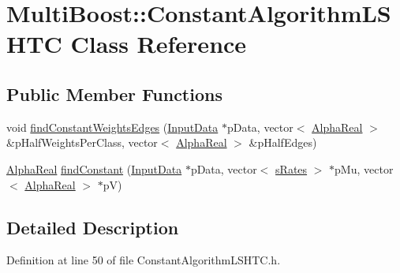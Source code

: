 \hypertarget{classMultiBoost_1_1ConstantAlgorithmLSHTC}{\section{Multi\-Boost\-:\-:Constant\-Algorithm\-L\-S\-H\-T\-C Class Reference}
\label{classMultiBoost_1_1ConstantAlgorithmLSHTC}
}
\subsection*{Public Member Functions}
\begin{DoxyCompactItemize}
\item 
void \hyperlink{classMultiBoost_1_1ConstantAlgorithmLSHTC_a9bf95b6a32ca7af3df53ab3d76f16bca}{find\-Constant\-Weights\-Edges} (\hyperlink{classMultiBoost_1_1InputData}{Input\-Data} $\ast$p\-Data, vector$<$ \hyperlink{Defaults_8h_a80184c4fd10ab70a1a17c5f97dcd1563}{Alpha\-Real} $>$ \&p\-Half\-Weights\-Per\-Class, vector$<$ \hyperlink{Defaults_8h_a80184c4fd10ab70a1a17c5f97dcd1563}{Alpha\-Real} $>$ \&p\-Half\-Edges)
\item 
\hyperlink{Defaults_8h_a80184c4fd10ab70a1a17c5f97dcd1563}{Alpha\-Real} \hyperlink{classMultiBoost_1_1ConstantAlgorithmLSHTC_a5a47d4c74e5e83f1d6710a559cad3c43}{find\-Constant} (\hyperlink{classMultiBoost_1_1InputData}{Input\-Data} $\ast$p\-Data, vector$<$ \hyperlink{structMultiBoost_1_1sRates}{s\-Rates} $>$ $\ast$p\-Mu, vector$<$ \hyperlink{Defaults_8h_a80184c4fd10ab70a1a17c5f97dcd1563}{Alpha\-Real} $>$ $\ast$p\-V)
\end{DoxyCompactItemize}


\subsection{Detailed Description}


Definition at line 50 of file Constant\-Algorithm\-L\-S\-H\-T\-C.\-h.



